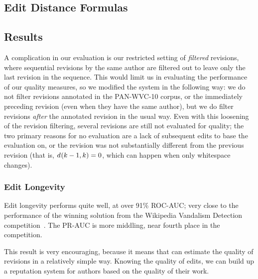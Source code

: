 
\subsection{Edit Distance Formulas}


\subsection{Results}

A complication in our evaluation is our restricted setting of
\textit{filtered} revisions, where sequential revisions by the
same author are filtered out to leave only the last revision
in the sequence.
This would limit us in evaluating the performance of our
quality measures, so we modified the system in the following way:
we do not filter revisions annotated in the PAN-WVC-10 corpus,
or the immediately preceding revision (even when they have the
same author), but we do filter revisions \textit{after} the annotated
revision in the usual way.
Even with this loosening of the revision filtering, several
revisions are still not evaluated for quality; the two
primary reasons for no evaluation are a lack of subsequent
edits to base the evaluation on, or the revision was not
substantially different from the previous revision
(that is, $d_{}(k-1,k) = 0$, which can happen when only
whitespace changes).

\subsubsection{Edit Longevity}

Edit longevity performs quite well, at over 91\% ROC-AUC;
very close to the performance of the winning solution from
the Wikipedia Vandalism Detection competition~\cite{Potthast2010b}.
The PR-AUC is more middling, near fourth place in the competition.

This result is very encouraging, because it means that can
estimate the quality of revisions in a relatively simple way.
Knowing the quality of edits, we can build up a reputation
system for authors based on the quality of their work.


